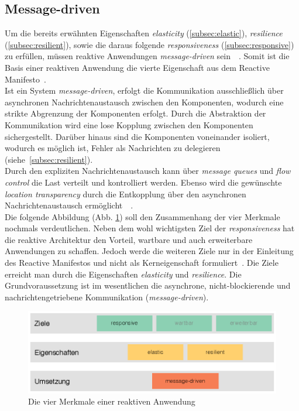 \subsection{Message-driven}\label{subsec:messagedriven}
Um die bereits erwähnten Eigenschaften \textit{elasticity} (\ref{subsec:elastic}), \textit{resilience} (\ref{subsec:resilient}), sowie die daraus folgende \textit{responsiveness} (\ref{subsec:responsive}) zu erfüllen, müssen reaktive Anwendungen \textit{message-driven} sein~\cite{webber_what_2014}~\cite[S.~43]{kuhn_reactive_2015}. Somit ist die Basis einer reaktiven Anwendung die vierte Eigenschaft aus dem Reactive Manifesto~\cite{boner_reactive_2014}.\\
Ist ein System \textit{message-driven}, erfolgt die Kommunikation ausschließlich über asynchronen Nachrichtenaustausch zwischen den Komponenten, wodurch eine strikte Abgrenzung der Komponenten erfolgt. Durch die Abstraktion der Kommunikation wird eine lose Kopplung zwischen den Komponenten sichergestellt. Darüber hinaus sind die Komponenten voneinander isoliert, wodurch es möglich ist, Fehler als Nachrichten zu delegieren (siehe~\ref{subsec:resilient}).\\
Durch den expliziten Nachrichtenaustausch kann über \textit{message queues} und \textit{flow control} die Last verteilt und kontrolliert werden. Ebenso wird die gewünschte \textit{location transparency} durch die Entkopplung über den asynchronen Nachrichtenaustausch ermöglicht~\cite{boner_reactive_2015}~\cite[S.~43]{kuhn_reactive_2015}.\\
Die folgende Abbildung (Abb. \ref{fig:four-traits}) soll den Zusammenhang der vier Merkmale nochmals verdeutlichen. Neben dem wohl wichtigsten Ziel der \textit{responsiveness} hat die reaktive Architektur den Vorteil, wartbare und auch erweiterbare Anwendungen zu schaffen. Jedoch werde die weiteren Ziele nur in der Einleitung des Reactive Manifestos und nicht als Kerneigenschaft formuliert~\cite{boner_reactive_2014}. Die Ziele erreicht man durch die Eigenschaften \textit{elasticity} und \textit{resilience}. Die Grundvoraussetzung ist im wesentlichen die asynchrone, nicht-blockierende und nachrichtengetriebene Kommunikation (\textit{message-driven}).

\begin{figure}[H]
 \centering
 \includegraphics[width=1.0\textwidth]{3-Grundlagen/four-traits/four-traits.eps}
 \caption{Die vier Merkmale einer reaktiven Anwendung \cite{kuhn_code_2015}}
 \label{fig:four-traits}
\end{figure}


